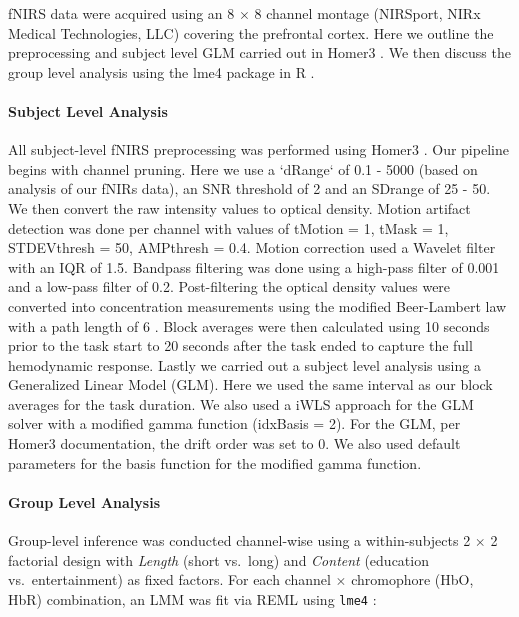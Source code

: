 \documentclass[10pt, twocolumn]{article}
\begin{document}
fNIRS data were acquired using an 8 $\times$ 8 channel montage (NIRSport, NIRx Medical Technologies, LLC) covering the prefrontal cortex. Here we outline the preprocessing and subject level GLM carried out in Homer3 \cite{Huppert2009HomERAR}. We then discuss the group level analysis using the lme4 package in R \cite{Bates2014FittingLM}.

\paragraph{Subject Level Analysis}

All subject-level fNIRS preprocessing was performed using Homer3 \cite{Huppert2009HomERAR}. Our pipeline begins with channel pruning. Here we use a `dRange` of 0.1 - 5000 (based on analysis of our fNIRs data), an SNR threshold of 2 and an SDrange of 25 - 50. We then convert the raw intensity values to optical density. Motion artifact detection was done per channel with values of tMotion = 1, tMask = 1, STDEVthresh = 50, AMPthresh = 0.4. Motion correction used a Wavelet filter with an IQR of 1.5. Bandpass filtering was done using a high-pass filter of 0.001 and a low-pass filter of 0.2. Post-filtering the optical density values were converted into concentration measurements using the modified Beer-Lambert law with a path length of 6 \cite{BeerLambertLaw}. Block averages were then calculated using 10 seconds prior to the task start to 20 seconds after the task ended to capture the full hemodynamic response. Lastly we carried out a subject level analysis using a Generalized Linear Model (GLM). Here we used the same interval as our block averages for the task duration. We also used a iWLS approach for the GLM solver with a modified gamma function (idxBasis = 2). For the GLM, per Homer3 documentation, the drift order was set to 0. We also used default parameters for the basis function for the modified gamma function.

\paragraph{Group Level Analysis}

Group-level inference was conducted channel-wise using a within-subjects 2 $\times$ 2 factorial design with \textit{Length} (short vs.\ long) and \textit{Content} (education vs.\ entertainment) as fixed factors. For each channel $\times$ chromophore (HbO, HbR) combination, an LMM was fit via REML using \texttt{lme4} \cite{Bates2014FittingLM}:
\end{document}
